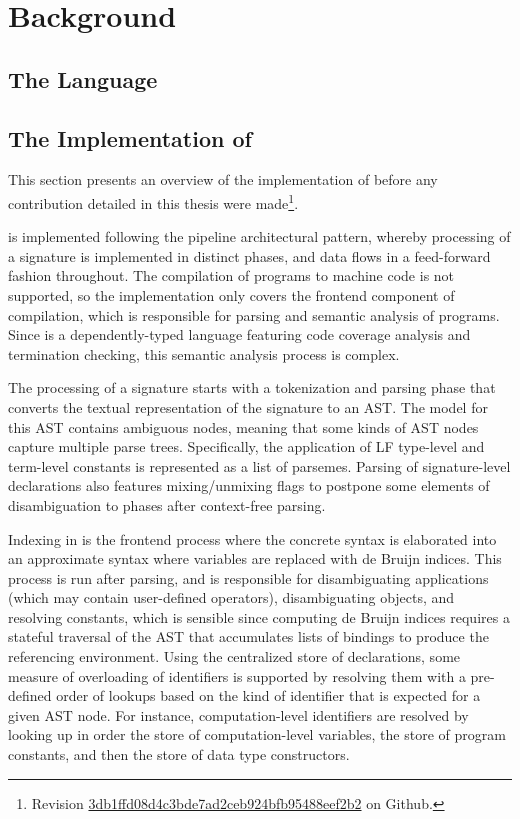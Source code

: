 \chapter{Background}

\section{The \Beluga Language}

\section{The Implementation of \Beluga} \label{section:beluga-implementation}

This section presents an overview of the implementation of \Beluga before any contribution detailed in this thesis were made\footnote{Revision \href{https://github.com/Beluga-lang/Beluga/tree/4769323d701722bde42a0e2570d892ef78cd2d04}{3db1ffd08d4c3bde7ad2ceb924bfb95488eef2b2} on Github.}.

\Beluga is implemented following the pipeline architectural pattern, whereby processing of a \Beluga signature is implemented in distinct phases, and data flows in a feed-forward fashion throughout.
The compilation of \Beluga programs to machine code is not supported, so the implementation only covers the frontend component of compilation, which is responsible for parsing and semantic analysis of programs.
Since \Beluga is a dependently-typed language featuring code coverage analysis and termination checking, this semantic analysis process is complex.


The processing of a \Beluga signature starts with a tokenization and parsing phase that converts the textual representation of the signature to an \ac{AST}.
The model for this \ac{AST} contains ambiguous nodes, meaning that some kinds of \ac{AST} nodes capture multiple parse trees.
Specifically, the application of LF type-level and term-level constants is represented as a list of parsemes.
Parsing of signature-level declarations also features mixing/unmixing flags to postpone some elements of disambiguation to phases after context-free parsing.

Indexing in \Beluga is the frontend process where the concrete syntax is elaborated into an approximate syntax where variables are replaced with de Bruijn indices.
This process is run after parsing, and is responsible for disambiguating applications (which may contain user-defined operators), disambiguating \LF objects, and resolving constants, which is sensible since computing de Bruijn indices requires a stateful traversal of the \ac{AST} that accumulates lists of bindings to produce the referencing environment.
Using the centralized store of declarations, some measure of overloading of identifiers is supported by resolving them with a pre-defined order of lookups based on the kind of identifier that is expected for a given \ac{AST} node.
For instance, computation-level identifiers are resolved by looking up in order the store of computation-level variables, the store of program constants, and then the store of data type constructors.

